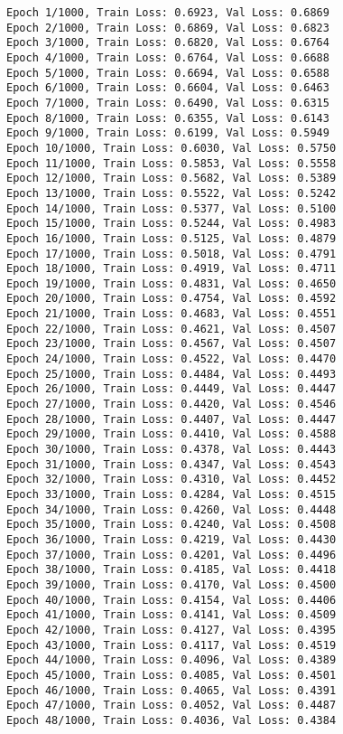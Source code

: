     \begin{Verbatim}[commandchars=\\\{\}]
Epoch 1/1000, Train Loss: 0.6923, Val Loss: 0.6869
Epoch 2/1000, Train Loss: 0.6869, Val Loss: 0.6823
Epoch 3/1000, Train Loss: 0.6820, Val Loss: 0.6764
Epoch 4/1000, Train Loss: 0.6764, Val Loss: 0.6688
Epoch 5/1000, Train Loss: 0.6694, Val Loss: 0.6588
Epoch 6/1000, Train Loss: 0.6604, Val Loss: 0.6463
Epoch 7/1000, Train Loss: 0.6490, Val Loss: 0.6315
Epoch 8/1000, Train Loss: 0.6355, Val Loss: 0.6143
Epoch 9/1000, Train Loss: 0.6199, Val Loss: 0.5949
Epoch 10/1000, Train Loss: 0.6030, Val Loss: 0.5750
Epoch 11/1000, Train Loss: 0.5853, Val Loss: 0.5558
Epoch 12/1000, Train Loss: 0.5682, Val Loss: 0.5389
Epoch 13/1000, Train Loss: 0.5522, Val Loss: 0.5242
Epoch 14/1000, Train Loss: 0.5377, Val Loss: 0.5100
Epoch 15/1000, Train Loss: 0.5244, Val Loss: 0.4983
Epoch 16/1000, Train Loss: 0.5125, Val Loss: 0.4879
Epoch 17/1000, Train Loss: 0.5018, Val Loss: 0.4791
Epoch 18/1000, Train Loss: 0.4919, Val Loss: 0.4711
Epoch 19/1000, Train Loss: 0.4831, Val Loss: 0.4650
Epoch 20/1000, Train Loss: 0.4754, Val Loss: 0.4592
Epoch 21/1000, Train Loss: 0.4683, Val Loss: 0.4551
Epoch 22/1000, Train Loss: 0.4621, Val Loss: 0.4507
Epoch 23/1000, Train Loss: 0.4567, Val Loss: 0.4507
Epoch 24/1000, Train Loss: 0.4522, Val Loss: 0.4470
Epoch 25/1000, Train Loss: 0.4484, Val Loss: 0.4493
Epoch 26/1000, Train Loss: 0.4449, Val Loss: 0.4447
Epoch 27/1000, Train Loss: 0.4420, Val Loss: 0.4546
Epoch 28/1000, Train Loss: 0.4407, Val Loss: 0.4447
Epoch 29/1000, Train Loss: 0.4410, Val Loss: 0.4588
Epoch 30/1000, Train Loss: 0.4378, Val Loss: 0.4443
Epoch 31/1000, Train Loss: 0.4347, Val Loss: 0.4543
Epoch 32/1000, Train Loss: 0.4310, Val Loss: 0.4452
Epoch 33/1000, Train Loss: 0.4284, Val Loss: 0.4515
Epoch 34/1000, Train Loss: 0.4260, Val Loss: 0.4448
Epoch 35/1000, Train Loss: 0.4240, Val Loss: 0.4508
Epoch 36/1000, Train Loss: 0.4219, Val Loss: 0.4430
Epoch 37/1000, Train Loss: 0.4201, Val Loss: 0.4496
Epoch 38/1000, Train Loss: 0.4185, Val Loss: 0.4418
Epoch 39/1000, Train Loss: 0.4170, Val Loss: 0.4500
Epoch 40/1000, Train Loss: 0.4154, Val Loss: 0.4406
Epoch 41/1000, Train Loss: 0.4141, Val Loss: 0.4509
Epoch 42/1000, Train Loss: 0.4127, Val Loss: 0.4395
Epoch 43/1000, Train Loss: 0.4117, Val Loss: 0.4519
Epoch 44/1000, Train Loss: 0.4096, Val Loss: 0.4389
Epoch 45/1000, Train Loss: 0.4085, Val Loss: 0.4501
Epoch 46/1000, Train Loss: 0.4065, Val Loss: 0.4391
Epoch 47/1000, Train Loss: 0.4052, Val Loss: 0.4487
Epoch 48/1000, Train Loss: 0.4036, Val Loss: 0.4384

\end{Verbatim}
